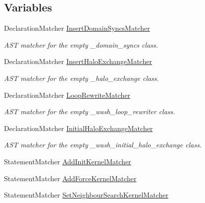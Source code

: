 \subsection*{Variables}
\begin{DoxyCompactItemize}
\item 
Declaration\+Matcher \mbox{\hyperlink{namespacews2st_1_1dependency__detection_ae64f771d376afa52054c5d9563d242f2}{Insert\+Domain\+Syncs\+Matcher}}
\begin{DoxyCompactList}\small\item\em A\+ST matcher for the empty \+\_\+domain\+\_\+syncs class. \end{DoxyCompactList}\item 
Declaration\+Matcher \mbox{\hyperlink{namespacews2st_1_1dependency__detection_aa3946ed2a34fd136544f447954b530e1}{Insert\+Halo\+Exchange\+Matcher}}
\begin{DoxyCompactList}\small\item\em A\+ST matcher for the empty \+\_\+halo\+\_\+exchange class. \end{DoxyCompactList}\item 
Declaration\+Matcher \mbox{\hyperlink{namespacews2st_1_1dependency__detection_a6d11e3426c8b2c1d088996d1f2c847f0}{Loop\+Rewrite\+Matcher}}
\begin{DoxyCompactList}\small\item\em A\+ST matcher for the empty \+\_\+wash\+\_\+loop\+\_\+rewriter class. \end{DoxyCompactList}\item 
Declaration\+Matcher \mbox{\hyperlink{namespacews2st_1_1dependency__detection_a4f1b7b6a99e43f2c522554396c0b3a09}{Initial\+Halo\+Exchange\+Matcher}}
\begin{DoxyCompactList}\small\item\em A\+ST matcher for the empty \+\_\+wash\+\_\+initial\+\_\+halo\+\_\+exchange class. \end{DoxyCompactList}\item 
Statement\+Matcher \mbox{\hyperlink{namespacews2st_1_1dependency__detection_a243f082eabf51fdabcc2a5e92659c242}{Add\+Init\+Kernel\+Matcher}}
\item 
Statement\+Matcher \mbox{\hyperlink{namespacews2st_1_1dependency__detection_a2e41b3265e8d011f4c0834b0b6d924ee}{Add\+Force\+Kernel\+Matcher}}
\item 
Statement\+Matcher \mbox{\hyperlink{namespacews2st_1_1dependency__detection_a345d52aca3e8d90256860c4159a402a3}{Set\+Neighbour\+Search\+Kernel\+Matcher}}
\item 

\end{DoxyCompactItemize}
